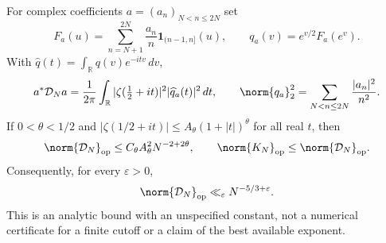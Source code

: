 \begin{proposition}
\label{prop:v158-mellin-budget}
For complex coefficients $a=(a_n)_{N<n\leq2N}$ set
\[
 F_a(u)=\sum_{n=N+1}^{2N}\frac{a_n}{n}\mathbf1_{(n-1,n]}(u),
 \qquad q_a(v)=e^{v/2}F_a(e^v).
\]
With $\widehat q(t)=\int_{\mathbb R}q(v)e^{-itv}\,dv$,
\begin{equation}
 a^*\mathcal D_Na
 =\frac1{2\pi}\int_{\mathbb R}
       |\zeta(\tfrac12+it)|^2|\widehat q_a(t)|^2\,dt,
 \qquad
 \norm{q_a}_2^2=\sum_{N<n\leq2N}\frac{|a_n|^2}{n^2}.
 \label{eq:v158-mellin-identity}
\end{equation}
If $0<\theta<1/2$ and
$|\zeta(1/2+it)|\leq A_\theta(1+|t|)^\theta$ for all real $t$, then
\begin{equation}
 \norm{\mathcal D_N}_{\rm op}
 \leq C_\theta A_\theta^2 N^{-2+2\theta},
 \qquad \norm{K_N}_{\rm op}\leq\norm{\mathcal D_N}_{\rm op}.
 \label{eq:v158-zeta-budget}
\end{equation}
Consequently, for every $\varepsilon>0$,
\begin{equation}
 \norm{\mathcal D_N}_{\rm op}\ll_\varepsilon N^{-5/3+\varepsilon}.
 \label{eq:v158-weyl-budget}
\end{equation}
This is an analytic bound with an unspecified constant, not a numerical
certificate for a finite cutoff or a claim of the best available exponent.
\end{proposition}
